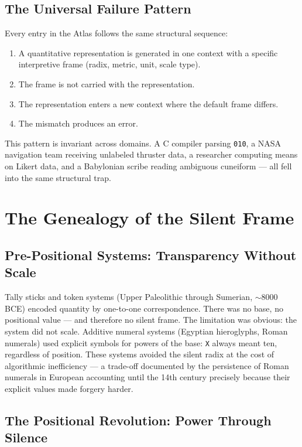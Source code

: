 \documentclass[12pt,a4paper]{article}
\theoremstyle{definition}
\theoremstyle{remark}
\begin{document}
\subsection{The Universal Failure Pattern}

Every entry in the Atlas follows the same structural sequence:
\begin{enumerate}[nosep]
  \item A quantitative representation is generated in one context with a specific
        interpretive frame (radix, metric, unit, scale type).
  \item The frame is not carried with the representation.
  \item The representation enters a new context where the default frame differs.
  \item The mismatch produces an error.
\end{enumerate}

This pattern is invariant across domains. A C compiler parsing \texttt{010}, a NASA
navigation team receiving unlabeled thruster data, a researcher computing means on
Likert data, and a Babylonian scribe reading ambiguous cuneiform --- all fell into
the same structural trap.

\section{The Genealogy of the Silent Frame}

\subsection{Pre-Positional Systems: Transparency Without Scale}

Tally sticks and token systems (Upper Paleolithic through Sumerian, $\sim$8000 BCE)
encoded quantity by one-to-one correspondence. There was no base, no positional
value --- and therefore no silent frame. The limitation was obvious: the system did
not scale. Additive numeral systems (Egyptian hieroglyphs, Roman numerals) used
explicit symbols for powers of the base: \texttt{X} always meant ten, regardless of
position. These systems avoided the silent radix at the cost of algorithmic
inefficiency --- a trade-off documented by the persistence of Roman numerals in
European accounting until the 14th century precisely because their explicit values
made forgery harder.

\subsection{The Positional Revolution: Power Through Silence}
\end{document}
